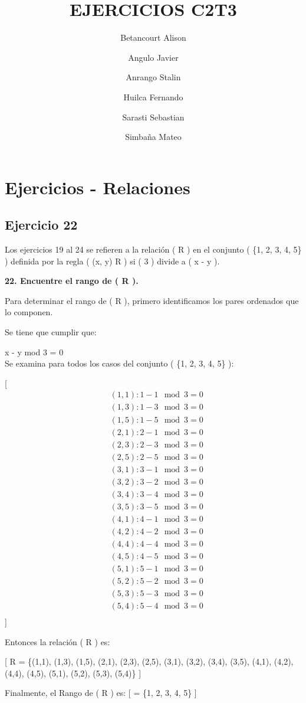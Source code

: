 \documentclass[
  letterpaper,
  DIV=11,
  numbers=noendperiod]{scrartcl}
\title{EJERCICIOS C2T3}
\author{Betancourt Alison \and Angulo Javier \and Anrango
Stalin \and Huilca Fernando \and Sarasti Sebastian \and Simbaña Mateo}
\date{}
\renewcommand*\contentsname{Table of contents}
\newcommand\contentsname{Table of contents}
\begin{document}
\maketitle
\renewcommand*\contentsname{Contenido}
{
\hypersetup{linkcolor=}
\setcounter{tocdepth}{3}
\tableofcontents
}
\hypertarget{ejercicios---relaciones}{%
\section{Ejercicios - Relaciones}\label{ejercicios---relaciones}}

\hypertarget{ejercicio-22}{%
\subsection{Ejercicio 22}\label{ejercicio-22}}

Los ejercicios 19 al 24 se refieren a la relación ( R ) en el conjunto (
\{1, 2, 3, 4, 5\} ) definida por la regla ( (x, y) \in R ) si ( 3 )
divide a ( x - y ).

\textbf{22. Encuentre el rango de ( R ).}

Para determinar el rango de ( R ), primero identificamos los pares
ordenados que lo componen.

Se tiene que cumplir que:

\hfill\break
x - y mod 3 = 0\\

Se examina para todos los casos del conjunto ( \{1, 2, 3, 4, 5\} ):

{[} \begin{align*}
&(1,1): 1 - 1 \mod 3 = 0 \\
&(1,3): 1 - 3 \mod 3 = 0 \\
&(1,5): 1 - 5 \mod 3 = 0 \\
&(2,1): 2 - 1 \mod 3 = 0 \\
&(2,3): 2 - 3 \mod 3 = 0 \\
&(2,5): 2 - 5 \mod 3 = 0 \\
&(3,1): 3 - 1 \mod 3 = 0 \\
&(3,2): 3 - 2 \mod 3 = 0 \\
&(3,4): 3 - 4 \mod 3 = 0 \\
&(3,5): 3 - 5 \mod 3 = 0 \\
&(4,1): 4 - 1 \mod 3 = 0 \\
&(4,2): 4 - 2 \mod 3 = 0 \\
&(4,4): 4 - 4 \mod 3 = 0 \\
&(4,5): 4 - 5 \mod 3 = 0 \\
&(5,1): 5 - 1 \mod 3 = 0 \\
&(5,2): 5 - 2 \mod 3 = 0 \\
&(5,3): 5 - 3 \mod 3 = 0 \\
&(5,4): 5 - 4 \mod 3 = 0 \\
\end{align*} {]}

Entonces la relación ( R ) es:

{[} R = \{(1,1), (1,3), (1,5), (2,1), (2,3), (2,5), (3,1), (3,2), (3,4),
(3,5), (4,1), (4,2), (4,4), (4,5), (5,1), (5,2), (5,3), (5,4)\} {]}

Finalmente, el Rango de ( R ) es: {[}  = \{1, 2, 3, 4, 5\}
{]}
\end{document}
